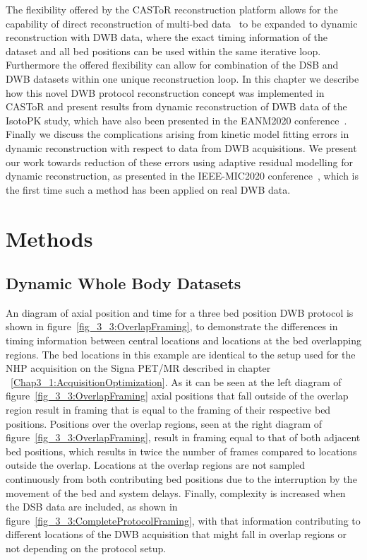 The flexibility offered by the CASToR reconstruction platform allows for the capability of direct reconstruction of multi-bed data~\cite{Ross2004} to be expanded to dynamic reconstruction with DWB data, where the exact timing information of the dataset and all bed positions can be used within the same iterative loop. Furthermore the offered flexibility can allow for combination of the DSB and DWB datasets within one unique reconstruction loop.
In this chapter we describe how this novel DWB protocol reconstruction concept was implemented in CASToR and present results from dynamic reconstruction of DWB data of the IsotoPK study, which have also been presented in the EANM2020 conference~\cite{chalampalakis2020EANM}.
Finally we discuss the complications arising from kinetic model fitting errors in dynamic reconstruction with respect to data from DWB acquisitions. We present our work towards reduction of these errors using adaptive residual modelling for dynamic reconstruction, as presented in the IEEE-MIC2020 conference~\cite{}, which is the first time such a method has been applied on real DWB data.

\section{Methods}
\subsection{Dynamic Whole Body Datasets}
An diagram of axial position and time for a three bed position DWB protocol is shown in figure~\ref{fig_3_3:OverlapFraming}, to demonstrate the differences in timing information between central locations and locations at the bed overlapping regions. The bed locations in this example are identical to the setup used for the NHP acquisition on the Signa PET/MR described in chapter ~\ref{Chap3_1:AcquisitionOptimization}.
As it can be seen at the left diagram of figure~\ref{fig_3_3:OverlapFraming} axial positions that fall outside of the overlap region result in framing that is equal to the framing of their respective bed positions. Positions over the overlap regions, seen at the right diagram of figure~\ref{fig_3_3:OverlapFraming}, result in framing equal to that of both adjacent bed positions, which results in twice the number of frames compared to locations outside the overlap. Locations at the overlap regions are not sampled continuously from both contributing bed positions due to the interruption by the movement of the bed and system delays.  
Finally, complexity is increased when the DSB data are included, as shown in figure~\ref{fig_3_3:CompleteProtocolFraming}, with that information contributing to different locations of the DWB acquisition that might fall in overlap regions or not depending on the protocol setup. 


